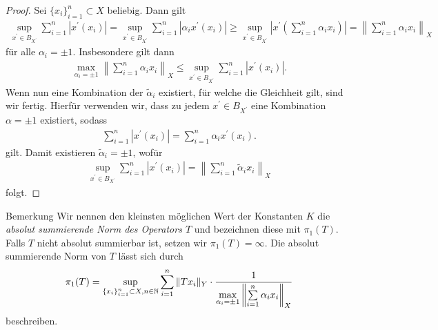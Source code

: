 \begin{proof}
	Sei $  \{x_i\}_{i =1}^n \subset X$ beliebig.
	Dann gilt
	\begin{align*}
		\sup \limits_{x^\prime \in B_{X^\prime}} 
		\sum \limits_{i = 1}^n
		|x^\prime(x_i)|
		=
		\sup \limits_{x^\prime \in B_{X^\prime}} 
		\sum \limits_{i = 1}^n
		| \alpha_i x^\prime(x_i)|
		\geq 
		\sup \limits_{x^\prime \in B_{X^\prime}} 
		\left|
		x^\prime \left(
		\sum \limits_{i = 1}^n
		\alpha_i x_i
		\right)
		\right|
		=
		\left\| 
		\sum \limits_{i = 1}^n
		\alpha_i x_i
		\right\|_X
	\end{align*}
	für alle $ \alpha_i = \pm 1 $. Insbesondere gilt dann
	\begin{align*}
		\max \limits_{\alpha_i = \pm 1}
		\left\|
		\sum \limits_{i=1}^n \alpha_i x_i
		\right\|_X
		\leq 
		\sup \limits_{x^\prime \in B_{X^\prime}} 
		\sum \limits_{i = 1}^n
		|x^\prime(x_i)|.
	\end{align*} 
	Wenn nun eine Kombination der $ \tilde{\alpha}_i $ existiert, für welche die Gleichheit gilt, sind wir fertig.
	Hierfür verwenden wir, dass zu jedem $ x^\prime \in  B_{X^\prime} $ eine Kombination $ \alpha = \pm 1 $ existiert, sodass 
	\begin{align*}
		\sum \limits_{ i = 1}^n | x^\prime(x_i) |
		=
		\sum \limits_{ i = 1}^n \alpha _i x^\prime(x_i). 
	\end{align*}
	gilt. Damit existieren $ \tilde{\alpha}_i = \pm 1 $, wofür
	\begin{align*}
		\sup \limits_{x^\prime \in B_{X^\prime}} 
		\sum \limits_{i = 1}^n
		|x^\prime(x_i)|
		=
		\left\|
		\sum \limits_{i=1}^n \tilde{\alpha}_i x_i
		\right\|_X
	\end{align*}
	folgt.
\end{proof}
\newpage
\begin{genericdf}{Bemerkung}
	Wir nennen den kleinsten möglichen Wert der Konstanten $ K $  die \textit{absolut summierende Norm des Operators $ T $} und bezeichnen diese mit $ \pi_1(T) $.
	Falls $ T $ nicht absolut summierbar ist, setzen wir $ \pi_1(T) = \infty $.
	Die absolut summierende Norm von $ T $ lässt sich durch
	\begin{align}\label{eq:abs_sum_norm}
		\pi_1(T)
		=
		\sup \limits_{\{x_i\}_{i=1}^n \subset X, n \in \mathbb{N}}
		\sum \limits_{i = 1}^n \| T x_i \|_Y \cdot \frac{1}{\max \limits_{\alpha_i = \pm 1} \left\| \sum \limits_{i=1}^n \alpha_i x_i \right\|_X}
	\end{align}
	beschreiben.
\end{genericdf}


